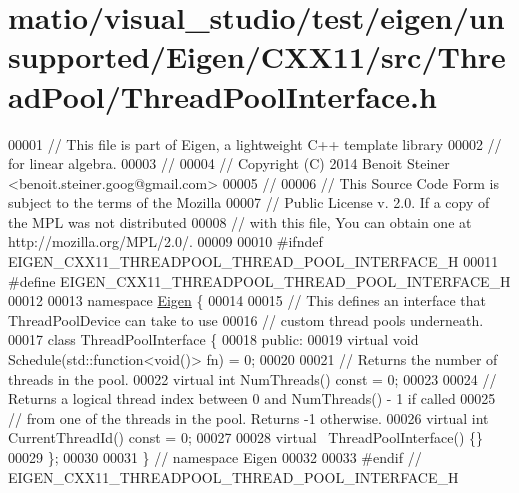 \hypertarget{matio_2visual__studio_2test_2eigen_2unsupported_2_eigen_2_c_x_x11_2src_2_thread_pool_2_thread_pool_interface_8h_source}{}\section{matio/visual\+\_\+studio/test/eigen/unsupported/\+Eigen/\+C\+X\+X11/src/\+Thread\+Pool/\+Thread\+Pool\+Interface.h}
\label{matio_2visual__studio_2test_2eigen_2unsupported_2_eigen_2_c_x_x11_2src_2_thread_pool_2_thread_pool_interface_8h_source}

\begin{DoxyCode}
00001 \textcolor{comment}{// This file is part of Eigen, a lightweight C++ template library}
00002 \textcolor{comment}{// for linear algebra.}
00003 \textcolor{comment}{//}
00004 \textcolor{comment}{// Copyright (C) 2014 Benoit Steiner <benoit.steiner.goog@gmail.com>}
00005 \textcolor{comment}{//}
00006 \textcolor{comment}{// This Source Code Form is subject to the terms of the Mozilla}
00007 \textcolor{comment}{// Public License v. 2.0. If a copy of the MPL was not distributed}
00008 \textcolor{comment}{// with this file, You can obtain one at http://mozilla.org/MPL/2.0/.}
00009 
00010 \textcolor{preprocessor}{#ifndef EIGEN\_CXX11\_THREADPOOL\_THREAD\_POOL\_INTERFACE\_H}
00011 \textcolor{preprocessor}{#define EIGEN\_CXX11\_THREADPOOL\_THREAD\_POOL\_INTERFACE\_H}
00012 
00013 \textcolor{keyword}{namespace }\hyperlink{namespace_eigen}{Eigen} \{
00014 
00015 \textcolor{comment}{// This defines an interface that ThreadPoolDevice can take to use}
00016 \textcolor{comment}{// custom thread pools underneath.}
00017 \textcolor{keyword}{class }ThreadPoolInterface \{
00018  \textcolor{keyword}{public}:
00019   \textcolor{keyword}{virtual} \textcolor{keywordtype}{void} Schedule(std::function<\textcolor{keywordtype}{void}()> fn) = 0;
00020 
00021   \textcolor{comment}{// Returns the number of threads in the pool.}
00022   \textcolor{keyword}{virtual} \textcolor{keywordtype}{int} NumThreads() \textcolor{keyword}{const} = 0;
00023 
00024   \textcolor{comment}{// Returns a logical thread index between 0 and NumThreads() - 1 if called}
00025   \textcolor{comment}{// from one of the threads in the pool. Returns -1 otherwise.}
00026   \textcolor{keyword}{virtual} \textcolor{keywordtype}{int} CurrentThreadId() \textcolor{keyword}{const} = 0;
00027 
00028   \textcolor{keyword}{virtual} ~ThreadPoolInterface() \{\}
00029 \};
00030 
00031 \}  \textcolor{comment}{// namespace Eigen}
00032 
00033 \textcolor{preprocessor}{#endif  // EIGEN\_CXX11\_THREADPOOL\_THREAD\_POOL\_INTERFACE\_H}
\end{DoxyCode}
